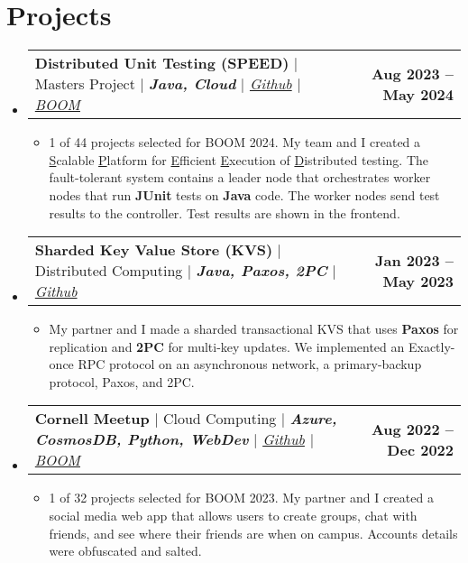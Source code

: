 \documentclass[letterpaper,11pt]{article}
\makeatletter
\newcommand{\resumeItem}[1]{
  \item\small{
    {#1 \vspace{-2pt}}
  }
}
\newcommand{\resumeProjectHeading}[2]{
    \item
    \begin{tabular*}{1.001\textwidth}{l@{\extracolsep{\fill}}r}
      \small#1 & \textbf{\small #2}\\
    \end{tabular*}\vspace{-7pt}
}
\newcommand{\resumeSubHeadingListStart}{\begin{itemize}[leftmargin=0.0in, label={}]}
\newcommand{\resumeSubHeadingListEnd}{\end{itemize}}
\newcommand{\resumeItemListStart}{\begin{itemize}}
\newcommand{\resumeItemListEnd}{\end{itemize}\vspace{-5pt}}
\makeatother
\begin{document}
\section{\textcolor{customred}{Projects}}
    \vspace{-6pt}
    \resumeSubHeadingListStart
    \resumeProjectHeading
          {\textbf{Distributed Unit Testing (SPEED)} $|$ Masters Project $|$ \textbf{\emph{Java, Cloud}}\emph{ $|$
          \href{https://github.com/MitchellGray100/SPEED}{Github} $|$ \href{https://cis.cornell.edu/about/outreach-events/boom-bits-our-minds/projects/boom-2024-projects}{BOOM}}}{Aug 2023 -- May 2024}
          \resumeItemListStart
            \resumeItem{1 of 44 projects selected for BOOM 2024. My team and I created a \underline{S}calable \underline{P}latform for \underline{E}fficient \underline{E}xecution of
            \underline{D}istributed testing. The fault-tolerant system contains a leader node that orchestrates worker nodes that 
            run \textbf{JUnit} tests on \textbf{Java} code. The worker nodes send test results to the controller. Test results are
            shown in the frontend.
            }
          \resumeItemListEnd
          \vspace{-14pt}
    \resumeProjectHeading
          {\textbf{Sharded Key Value Store (KVS)} $|$ Distributed Computing $|$ \textbf{\emph{Java, Paxos, 2PC}}\emph{ $|$
          \href{https://github.com/emichael/dslabs}{Github}}}{Jan 2023 -- May 2023}
          \resumeItemListStart
            \resumeItem{My partner and I made a sharded transactional KVS that uses \textbf{Paxos} for replication and \textbf{2PC} for multi-key updates. We implemented
            an Exactly-once RPC protocol on an asynchronous network, a primary-backup protocol, 
            Paxos, and 2PC.}
          \resumeItemListEnd
          \vspace{-14pt}
    \resumeProjectHeading
          {\textbf{Cornell Meetup} $|$ Cloud Computing $|$ \textbf{\emph{Azure, CosmosDB, Python, WebDev}}\emph{ $|$
          \href{https://github.com/MitchellGray100/CornellMeetUp}{Github}
          $|$ \href{https://cis.cornell.edu/about/outreach-events/boom-bits-our-minds/projects/boom-2023-projects}
          {BOOM}}}{Aug 2022 -- Dec 2022}
          \resumeItemListStart
            \resumeItem{1 of 32 projects selected for BOOM 2023. My partner and I created a 
            social media web app that allows users to create groups, chat with friends,
            and see where their friends are when on campus. Accounts details were obfuscated and salted.}
          \resumeItemListEnd
          \vspace{-14pt}
    \resumeSubHeadingListEnd
\vspace{-3pt}
\end{document}

